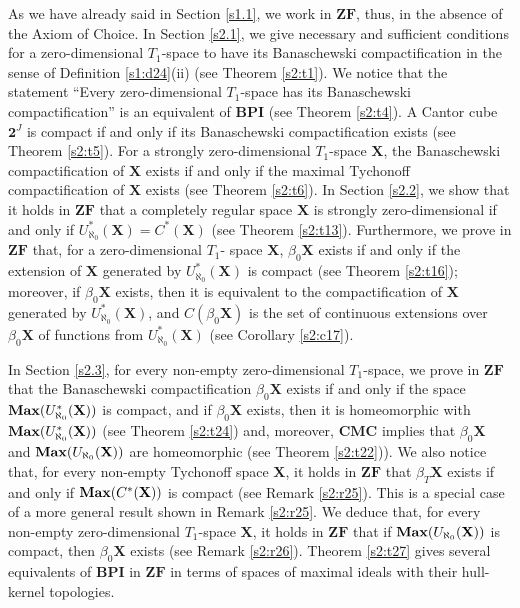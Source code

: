 \documentclass[12pt,twoside,leqno]{article}
\theoremstyle{plain}
\theoremstyle{definition}
\theoremstyle{remark}
\DeclareMathOperator{\BMax}{\bf{Max}}
\begin{document}
As we have already said in Section \ref{s1.1}, we work in $\mathbf{ZF}$, thus, in the absence of the Axiom of Choice. In Section \ref{s2.1}, we give necessary and sufficient conditions for a zero-dimensional $T_1$-space to have its Banaschewski compactification in the sense of Definition \ref{s1:d24}(ii) (see Theorem \ref{s2:t1}). We notice that the statement ``Every zero-dimensional $T_1$-space has its Banaschewski compactification'' is an equivalent of $\mathbf{BPI}$ (see Theorem \ref{s2:t4}). A Cantor cube $\mathbf{2}^J$ is compact if and only if its Banaschewski compactification exists (see Theorem \ref{s2:t5}). For a strongly zero-dimensional $T_1$-space $\mathbf{X}$, the Banaschewski compactification of $\mathbf{X}$ exists if and only if the maximal Tychonoff compactification of $\mathbf{X}$ exists (see Theorem \ref{s2:t6}).  In Section \ref{s2.2}, we show that it holds in $\mathbf{ZF}$ that a completely regular space $\mathbf{X}$ is strongly zero-dimensional if and only if $U_{\aleph_0}^{\ast}(\mathbf{X})=C^{\ast}(\mathbf{X})$ (see Theorem \ref{s2:t13}). Furthermore,  we prove in $\mathbf{ZF}$ that, for a zero-dimensional $T_1$- space $\mathbf{X}$, $\beta_0\mathbf{X}$ exists if and only if the extension of $\mathbf{X}$ generated by $U_{\aleph_0}^{\ast}(\mathbf{X})$ is compact (see Theorem \ref{s2:t16}); moreover, if $\beta_0\mathbf{X}$ exists, then it is equivalent to the compactification of $\mathbf{X}$ generated by $U_{\aleph_0}^{\ast}(\mathbf{X})$, and $C(\beta_0\mathbf{X})$ is the set of continuous extensions over $\beta_0\mathbf{X}$ of functions from $U_{\aleph_0}^{\ast}(\mathbf{X})$ (see Corollary \ref{s2:c17}).

In Section \ref{s2.3}, for every non-empty zero-dimensional $T_1$-space, we prove in $\mathbf{ZF}$ that the Banaschewski compactification $\beta_0\mathbf{X}$ exists if and only if the space $\BMax(U_{\aleph_0}^{\ast}(\mathbf{X}))$ is compact, and if $\beta_0\mathbf{X}$ exists, then it is homeomorphic with $\BMax(U_{\aleph_0}^{\ast}(\mathbf{X}))$ (see Theorem \ref{s2:t24}) and, moreover,  $\mathbf{CMC}$ implies that  $\beta_0\mathbf{X}$ and $\BMax(U_{\aleph_0}(\mathbf{X}))$ are homeomorphic (see Theorem \ref{s2:t22})).  We also notice that, for every non-empty Tychonoff space $\mathbf{X}$, it holds in $\mathbf{ZF}$ that $\beta_T\mathbf{X}$ exists if and only if $\BMax(C^{\ast}(\mathbf{X}))$ is compact (see Remark \ref{s2:r25}). This is a special case of a more general result shown in Remark \ref{s2:r25}. We deduce that, for every non-empty zero-dimensional $T_1$-space $\mathbf{X}$, it  holds in $\mathbf{ZF}$ that if $\BMax(U_{\aleph_0}(\mathbf{X}))$ is compact, then $\beta_0\mathbf{X}$ exists (see Remark \ref{s2:r26}). Theorem \ref{s2:t27} gives several equivalents of $\mathbf{BPI}$ in $\mathbf{ZF}$ in terms of spaces of maximal ideals with their hull-kernel topologies.
\end{document}
